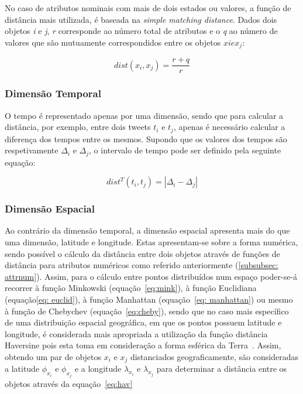 No caso de atributos nominais com mais de dois estados ou valores, a função de distância mais utilizada, é baseada na \textit{simple matching distance}. Dados dois objetos \textit{i} e \textit{j}, \textit{r} corresponde ao número total de atributos e o \textit{q} ao número de valores que são mutuamente correspondidos entre os objetos $x{i} e x_{j}$:

\begin{equation}
 dist(x_{i}, x_{j}) =  \frac{r + q}{r}
\end{equation}

\subsubsection{Dimensão Temporal} \label{subsubsec: time}

O tempo é representado apenas por uma dimensão, sendo que para calcular a distância, por exemplo, entre dois tweets $ t_{i} $ e $ t_{j} $, apenas é necessário calcular a diferença dos tempos entre os mesmos. Supondo que os valores dos tempos são respetivamente $ \Delta_{i} $ e $ \Delta_{j} $, o intervalo de tempo pode ser definido pela seguinte equação:

\begin{equation}
dist^{T}( t_{i}, t_{j}) = |\Delta_{i} - \Delta_{j}|  
\end{equation}


\subsubsection{Dimensão Espacial} \label{subsubsec: space}

Ao contrário da dimensão temporal, a dimensão espacial apresenta mais do que uma dimensão, latitude e longitude. Estas apresentam-se sobre a forma numérica, sendo possível o cálculo da distância entre dois objetos através de funções de distância para atributos numéricos como referido anteriormente (\ref{subsubsec: attrnum}). Assim, para o cálculo entre pontos distribuídos num espaço poder-se-á recorrer à função Minkowski (equação~\ref{eq:mink}), à função Euclidiana (equação\ref{eq: euclid}), à função Manhattan (equação~\ref{eq: manhattan}) ou mesmo à função de Chebychev (equação~\ref{eq:cheby}), sendo que no caso mais específico de uma distribuição espacial geográfica, em que os pontos possuem latitude e longitude, é considerada mais apropriada a utilização da função distância Haversine pois esta toma em consideração a forma esférica da Terra~\cite{Montavont2006}. Assim, obtendo um par de objetos $ x_{i} $ e $ x_{j} $ distanciados geograficamente, são consideradas a latitude $ \phi_{x_{i}} $ e $ \phi_{x_{j}} $ e a longitude $ \lambda_{x_{i}} $ e $ \lambda_{x_{j}} $ para determinar a distância entre os objetos através da equação~\ref{eq:hav}

